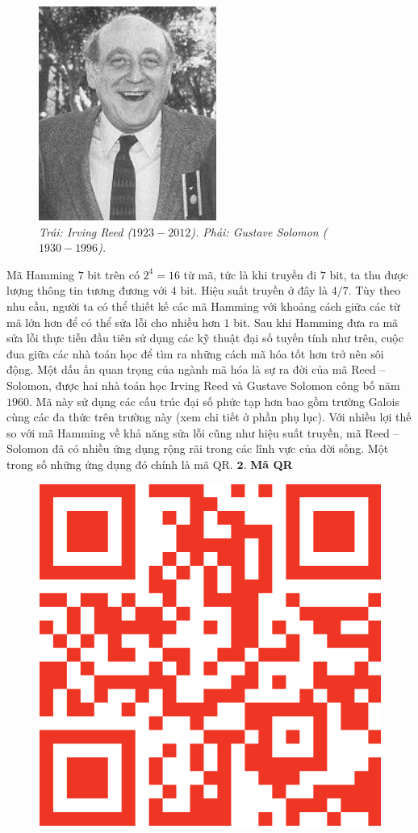 \begin{multicols}{2}
\begin{figure}[H]
		\includegraphics[height= 0.575\linewidth]{3}
		\caption{\small\textit{\color{toanhocdoisong}Trái: Irving Reed ($1923 - 2012$). Phải: Gustave Solomon ($1930 - 1996$).}}
		\vspace*{-10pt}
	\end{figure}
	Mã Hamming $7$ bit trên có $2^4=16$ từ mã, tức là khi truyền đi $7$ bit, ta thu được lượng thông tin tương đương với $4$ bit. Hiệu suất truyền ở đây là $4/7$. Tùy theo nhu cầu, người ta có thể thiết kế các mã Hamming với khoảng cách giữa các từ mã lớn hơn để có thể sửa lỗi cho nhiều hơn $1$ bit.
	\vskip 0.05cm
	Sau khi Hamming đưa ra mã sửa lỗi thực tiễn đầu tiên sử dụng các kỹ thuật đại số tuyến tính như trên, cuộc đua giữa các nhà toán học để tìm ra những cách mã hóa tốt hơn trở nên sôi động. Một dấu ấn quan trọng của ngành mã hóa là sự ra đời của mã Reed -- Solomon, được hai nhà toán học Irving Reed và Gustave Solomon công bố năm $1960$. Mã này sử dụng các cấu trúc đại số phức tạp hơn bao gồm trường Galois cùng các đa thức trên trường này (xem chi tiết ở phần phụ lục). Với nhiều lợi thế so với mã Hamming về khả năng sửa lỗi cũng như hiệu suất truyền, mã Reed -- Solomon đã có nhiều ứng dụng rộng rãi trong các lĩnh vực của đời sống. Một trong số những ứng dụng đó chính là mã QR. 
	\vskip 0.05cm
	$\pmb{2.}$ \textbf{\color{toanhocdoisong}\color{toanhocdoisong}Mã QR}
	\begin{figure}[H]
			\vspace*{-5pt}
			\centering
			\captionsetup{labelformat= empty, justification=centering}
			\includegraphics[width= 0.7\linewidth]{QR}

\end{figure}
\end{multicols}
